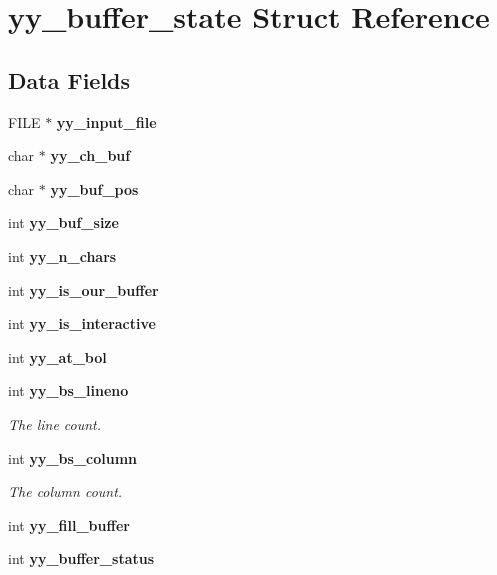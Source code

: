 \section{yy\-\_\-buffer\-\_\-state Struct Reference}
\label{structyy__buffer__state}
\subsection*{Data Fields}
\begin{DoxyCompactItemize}
\item 
F\-I\-L\-E $\ast$ {\bfseries yy\-\_\-input\-\_\-file}\label{structyy__buffer__state_a4360acfb226a1fc240ab2be17dd6beda}

\item 
char $\ast$ {\bfseries yy\-\_\-ch\-\_\-buf}\label{structyy__buffer__state_a0d25458e69eb22207fc633a1255d099d}

\item 
char $\ast$ {\bfseries yy\-\_\-buf\-\_\-pos}\label{structyy__buffer__state_a8435c3f786bbb55d21d0174e4cfc22a0}

\item 
int {\bfseries yy\-\_\-buf\-\_\-size}\label{structyy__buffer__state_a451d39697f006f3922c1f43cf79286b4}

\item 
int {\bfseries yy\-\_\-n\-\_\-chars}\label{structyy__buffer__state_a06406208824817acfec2183b79080945}

\item 
int {\bfseries yy\-\_\-is\-\_\-our\-\_\-buffer}\label{structyy__buffer__state_a80ce2431c70dc4f89ced487f18449465}

\item 
int {\bfseries yy\-\_\-is\-\_\-interactive}\label{structyy__buffer__state_abf5c70eea75581b58c0ee7bd31b14490}

\item 
int {\bfseries yy\-\_\-at\-\_\-bol}\label{structyy__buffer__state_a9d60c60af6e1a6f69de16871fd64f85f}

\item 
int {\bf yy\-\_\-bs\-\_\-lineno}
\begin{DoxyCompactList}\small\item\em The line count. \end{DoxyCompactList}\item 
int {\bf yy\-\_\-bs\-\_\-column}
\begin{DoxyCompactList}\small\item\em The column count. \end{DoxyCompactList}\item 
int {\bfseries yy\-\_\-fill\-\_\-buffer}\label{structyy__buffer__state_a63d2afbb1d79a3fc63df9e12626f827d}

\item 
int {\bfseries yy\-\_\-buffer\-\_\-status}\label{structyy__buffer__state_a70fd925d37a2f0454fbd0def675d106c}

\end{DoxyCompactItemize}


